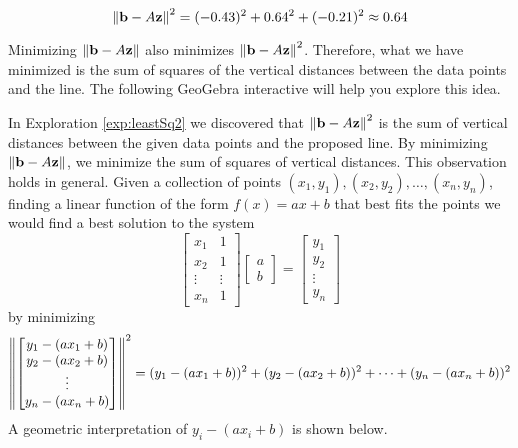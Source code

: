\documentclass{ximera}
\begin{document}
\begin{exploration}
\begin{equation}
    \left\lVert\mathbf{b}-A\mathbf{z}\right\rVert^2=(-0.43)^2+0.64^2+(-0.21)^2\approx 0.64
\end{equation}

Minimizing $\left\lVert\mathbf{b}-A\mathbf{z}\right\rVert$ also minimizes $\left\lVert\mathbf{b}-A\mathbf{z}\right\rVert^2$.  Therefore, what we have minimized is the sum of squares of the vertical distances between the data points and the line.
The following GeoGebra interactive will help you explore this idea.

\begin{onlineOnly}
\begin{center}
\end{center}
\end{onlineOnly}
\end{exploration}


In Exploration \ref{exp:leastSq2} we discovered that $\left\lVert\mathbf{b}-A\mathbf{z}\right\rVert^2$ is the sum of vertical distances between the given data points and the proposed line.  By minimizing $\left\lVert\mathbf{b}-A\mathbf{z}\right\rVert$, we minimize the sum of squares of vertical distances.  This observation holds in general.  Given a collection of points $(x_1, y_1), (x_2, y_2),\dots ,(x_n, y_n)$, finding a linear function of the form $f(x)=ax+b$ that best fits the points we would find a best solution to the system
$$\begin{bmatrix}x_1&1\\x_2&1\\\vdots&\vdots\\x_n&1\end{bmatrix}\begin{bmatrix}a\\b\end{bmatrix}=\begin{bmatrix}y_1\\y_2\\\vdots\\y_n\end{bmatrix}$$
by minimizing
$$\left\lVert\begin{bmatrix}y_1-(ax_1+b)\\y_2-(ax_2+b)\\\vdots\\y_n-(ax_n+b)\end{bmatrix}\right\rVert^2=(y_1-(ax_1+b))^2+(y_2-(ax_2+b))^2+\dots +(y_n-(ax_n+b))^2$$
A geometric interpretation of $y_i-(ax_i+b)$ is shown below.


\begin{center}
 \end{center}
\end{document}
